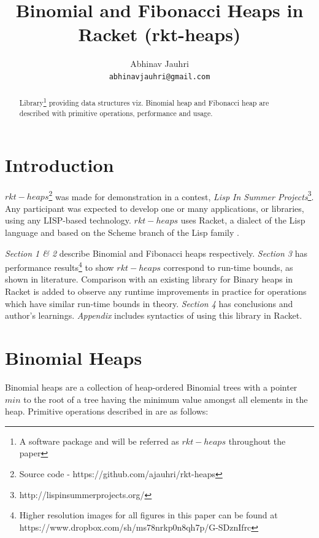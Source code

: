 \documentclass{llncs}
\title{Binomial and Fibonacci Heaps in Racket (rkt-heaps)}
\begin{document}
\author{
	Abhinav Jauhri\\
	\texttt{abhinavjauhri@gmail.com}\\
}

\maketitle

\begin{abstract}
	Library\footnote{A software package and will be referred as $rkt-heaps$ throughout the paper} providing data structures viz. Binomial heap \cite{vuillemin1978data} and Fibonacci heap\cite{fredman1987fibonacci} are described with primitive operations, performance and usage. 
\end{abstract}

\section{Introduction}
$rkt-heaps$\footnote{Source code - https://github.com/ajauhri/rkt-heaps} was made for demonstration in a contest, \textit{Lisp In Summer Projects}\footnote{http://lispinsummerprojects.org/}. Any participant was expected to develop one or many applications, or libraries, using any LISP-based technology. $rkt-heaps$ uses Racket, a dialect of the Lisp language and based on the Scheme branch of the Lisp family \cite{racket_dialect}. 

\emph{Section 1 \& 2} describe Binomial and Fibonacci heaps respectively. \emph{Section 3} has performance results\footnote{Higher resolution images for all figures in this paper can be found at https://www.dropbox.com/sh/ms78nrkp0n8qh7p/G-SDznIfrc} to show $rkt-heaps$ correspond to run-time bounds, as shown in literature. Comparison with an existing library for Binary heaps\cite{racket_binary} in Racket is added to observe any runtime improvements in practice for operations which have similar run-time bounds in theory. \emph{Section 4} has conclusions and author's learnings. \emph{Appendix} includes syntactics of using this library in Racket. 

\section{Binomial Heaps}
Binomial heaps are a collection of heap-ordered Binomial trees with a pointer $min$ to the root of a tree having the minimum value amongst all elements in the heap. Primitive operations described in \cite{kozen1992design} are as follows: \\
\end{document}
